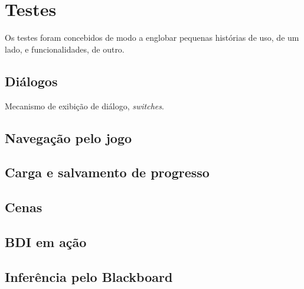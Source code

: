 \chapter{Testes}


Os testes foram concebidos de modo a englobar pequenas histórias de
uso, de um lado, e funcionalidades, de outro.

\section{Diálogos}

Mecanismo de exibição de diálogo, \emph{switches}.

\section{Navegação pelo jogo}

\section{Carga e salvamento de progresso}


\section{Cenas}

\section{BDI em ação}

\section{Inferência pelo Blackboard}

